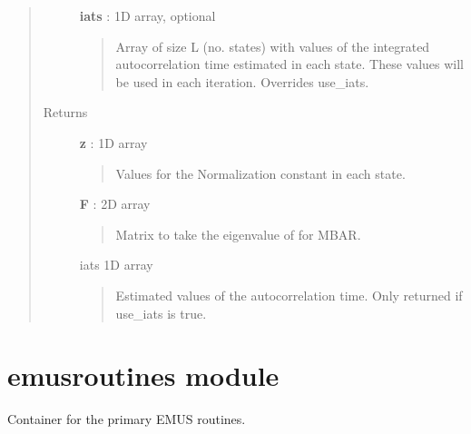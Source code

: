 \documentclass[letterpaper,10pt,english]{sphinxmanual}
\begin{document}
\begin{fulllineitems}
\begin{fulllineitems}
\begin{quote}
\begin{description}
\textbf{iats} : 1D array, optional
\begin{quote}

Array of size L (no. states) with values of the integrated autocorrelation time estimated in each state.  These values will be used in each iteration.  Overrides use\_iats.
\end{quote}

\item[{Returns}] \leavevmode
\textbf{z} : 1D array
\begin{quote}

Values for the Normalization constant in each state.
\end{quote}

\textbf{F} : 2D array
\begin{quote}

Matrix to take the eigenvalue of for MBAR.
\end{quote}

iats 1D array
\begin{quote}

Estimated values of the autocorrelation time.  Only returned if use\_iats is true.
\end{quote}

\end{description}\end{quote}

\end{fulllineitems}


\end{fulllineitems}



\section{emusroutines module}
\label{modules/emusroutines:module-emusroutines}\label{modules/emusroutines::doc}\label{modules/emusroutines:emusroutines-module}
Container for the primary EMUS routines.
\end{document}
